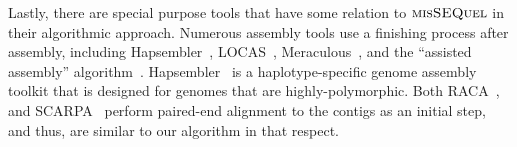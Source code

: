 Lastly, there are special purpose tools that have some relation to $\mbox{\rm {\sc misSEQuel}}$ in their algorithmic approach.
Numerous assembly tools use a finishing process after assembly, including Hapsembler~\cite{Donmez2011}, LOCAS~\cite{LOCAS}, Meraculous~\cite{Chapman2011}, and the ``assisted assembly'' algorithm~\cite{Gnerre2009}. Hapsembler~\cite{Donmez2011} is a haplotype-specific genome assembly toolkit that is designed for genomes that are highly-polymorphic. Both RACA~\cite{raca}, and SCARPA~\cite{scarpa} perform paired-end alignment to the contigs as an initial step, and thus, are similar to our algorithm in that respect. 






